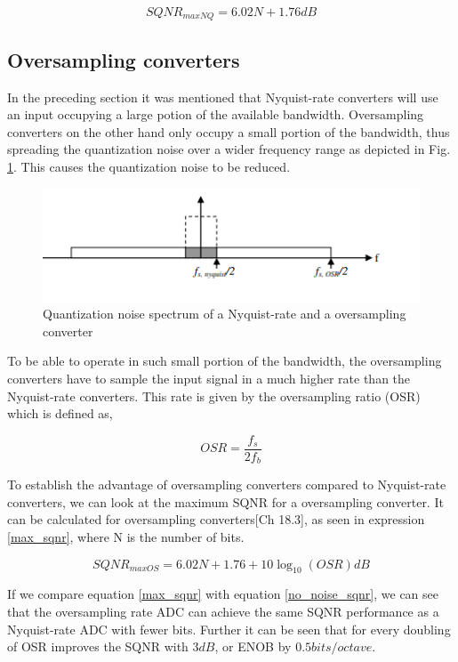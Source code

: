 \begin{equation}\label{no_noise_sqnr}
    SQNR_{maxNQ} = 6.02N + 1.76 dB
\end{equation}

\subsection{Oversampling converters}
In the preceding section it was mentioned that Nyquist-rate converters will use an input occupying a large potion of the available bandwidth. Oversampling converters on the other hand only occupy a small portion of the bandwidth, thus spreading the quantization noise over a wider frequency range as depicted in Fig. \ref{fig:oversample}. This causes the quantization noise to be reduced.  

\begin{figure}[h]
\centering
\includegraphics[scale=1]{images/oversample.png}
\caption{Quantization noise spectrum of a Nyquist-rate and a oversampling converter}
\label{fig:oversample}
\end{figure}

To be able to operate in such small portion of the bandwidth, the oversampling converters have to sample the input signal in a much higher rate than the Nyquist-rate converters. This rate is given by the oversampling ratio (OSR) which is defined as,

\begin{equation}
    OSR = \frac{f_s}{2f_b}
\end{equation}

To establish the advantage of oversampling converters compared to Nyquist-rate converters, we can look at the maximum SQNR for a oversampling converter. It can be calculated for oversampling converters\cite{Johns}[Ch 18.3], as seen in expression \ref{max_sqnr}, where N is the number of bits.


\begin{equation}\label{max_sqnr}
    SQNR_{maxOS} = 6.02N + 1.76 + 10\log_{10}(OSR) dB
\end{equation}

If we compare equation \ref{max_sqnr} with equation \ref{no_noise_sqnr}, we can see that the oversampling rate ADC can achieve the same SQNR performance as a Nyquist-rate ADC with fewer bits. Further it can be seen that for every doubling of OSR improves the SQNR with $3 dB$, or ENOB by $0.5bits/octave$. 


